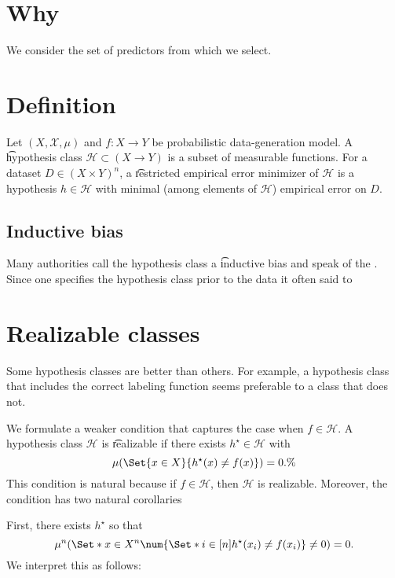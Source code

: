 

\section*{Why}

We consider the set of predictors from which we select.

\section*{Definition}

Let $(X, \mathcal{X} , \mu )$ and $f: X \to Y$ be probabilistic data-generation model.
A \t{hypothesis class} $\mathcal{H}  \subset (X \to Y)$ is a subset of measurable functions.
For a dataset $D \in (X \times  Y)^n$, a \t{restricted empirical error minimizer} of $\mathcal{H} $ is a hypothesis $h \in \mathcal{H} $ with minimal (among elements of $\mathcal{H} $) empirical error on $D$.

\subsection*{Inductive bias}

Many authorities call the hypothesis class a \t{inductive bias} and speak of  the .
Since one specifies the hypothesis class prior to the data it often said to 

\section*{Realizable classes}

Some hypothesis classes are better than others.
For example, a hypothesis class that includes the correct labeling function seems preferable to a class that does not.

We formulate a weaker condition that captures the case when $f \in \mathcal{H} $.
A hypothesis class $\mathcal{H} $ is \t{realizable} if there exists $h^{\star} \in \mathcal{H} $ with
    \[
\mu (\Set{x \in X}{h^\star(x) \neq f(x)}) = 0.\%
    \]
This condition is natural because if $f \in \mathcal{H} $, then $\mathcal{H} $ is realizable.
Moreover, the condition has two natural corollaries

First, there exists $h^\star$ so that
    \[
\mu ^n(\Set*{x \in X^n}{\num{\Set*{i \in [n]}{h^\star(x_i) \neq f(x_i)}} \neq 0}) = 0.
    \]
We interpret this as follows: 

